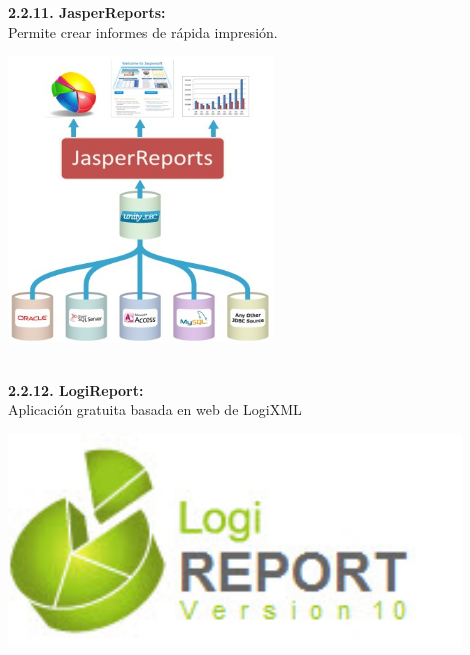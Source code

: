 \begin{flushleft}
\textbf{2.2.11. JasperReports: }\\ 
Permite crear informes de rápida impresión.
	\begin{center}
	\includegraphics[width=7cm]{./Imagenes/BIimagen11}
	\end{center}
\textbf{}\\
	
\textbf{2.2.12. LogiReport: }\\
Aplicación gratuita basada en web de LogiXML
	\begin{center}
	\includegraphics[width=12cm]{./Imagenes/BIimagen12}
	\end{center}
\textbf{}\\
	

\end{flushleft}
